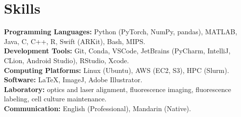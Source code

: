 \documentclass[letterpaper, 11pt]{article}
\newcommand{\subsectionvspace}{\vspace{6pt}}
\begin{document}




\section{Skills}


    \textbf{Programming Languages:} Python (PyTorch, NumPy, pandas), MATLAB, Java, C, C++, R, Swift (ARKit), Bash, MIPS. \\
    \textbf{Development Tools:} Git, Conda, VSCode, JetBrains (PyCharm, IntelliJ, CLion, Android Studio), RStudio, Xcode. \\
    \textbf{Computing Platforms:} Linux (Ubuntu), AWS (EC2, S3), HPC (Slurm). \\
    \textbf{Software:} LaTeX, ImageJ, Adobe Illustrator. \\
    \textbf{Laboratory:} optics and laser alignment, fluorescence imaging, fluorescence labeling, cell culture maintenance. \\
    \textbf{Communication:} English (Professional), Mandarin (Native).
\end{document}
